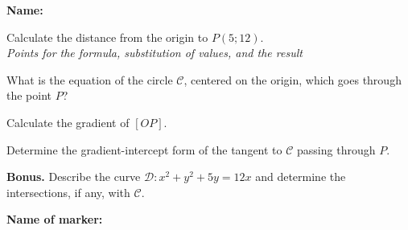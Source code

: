 \documentclass[9pt]{exam}
\begin{document}
\textbf{Name:} \dotfill

\begin{center}
\end{center}

\begin{questions}

\question[3] Calculate the distance from the origin to $P(5; 12)$. \\
\emph{Points for the formula, substitution of values, and the result}
\fillwithdottedlines{28mm}

\question[2] What is the equation of the circle $\mathcal{C}$, centered on the origin, which goes through the point $P$?
\fillwithdottedlines{14mm}

\question[3] Calculate the gradient of $[OP]$.
\fillwithdottedlines{14mm}

\question[4] Determine the gradient-intercept form of the tangent to $\mathcal{C}$ passing through $P$.


\question[0] \textbf{Bonus.} Describe the curve $\mathcal{D}: x^2 + y^2 + 5y  = 12x$ and determine the intersections, if any, with $\mathcal{C}$.
\end{questions}

\begin{tcolorbox}

\textbf{Name of marker:}

\begin{center}
\gradetable[h][questions]
\end{center}

\end{tcolorbox}
\end{document}
